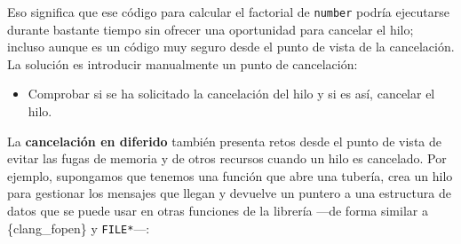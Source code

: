 Eso significa que ese código para calcular el factorial de
\texttt{number} podría ejecutarse durante bastante tiempo sin ofrecer
una oportunidad para cancelar el hilo; incluso aunque es un código muy
seguro desde el punto de vista de la cancelación. La solución es
introducir manualmente un punto de cancelación:

\begin{Shaded}
\begin{Highlighting}[]
\OperatorTok{=} \OperatorTok{;}
 \OperatorTok{(} \OperatorTok{=} \OperatorTok{;}\OperatorTok{\textless{}=}\OperatorTok{;}\OperatorTok{++} \OperatorTok{)}
\OperatorTok{\{}
\OperatorTok{=}\OperatorTok{*}\OperatorTok{;}
\OperatorTok{();}   
\OperatorTok{\}}
\end{Highlighting}
\end{Shaded}

\begin{itemize}
\item
  Comprobar si se ha solicitado la cancelación del hilo y si es así,
  cancelar el hilo.
\end{itemize}

La \textbf{cancelación en diferido} también presenta retos desde el
punto de vista de evitar las fugas de memoria y de otros recursos cuando
un hilo es cancelado. Por ejemplo, supongamos que tenemos una función
que abre una tubería, crea un hilo para gestionar los mensajes que
llegan y devuelve un puntero a una estructura de datos que se puede usar
en otras funciones de la librería ---de forma similar a \{clang\_fopen\}
y \texttt{FILE*}---:

